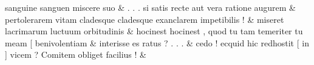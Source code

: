 \documentclass[12pt,onecolumn,twoside,a4paper]{memoir}
\begin{document}
\begin{pairs}
\begin{Leftside}
                              sanguine
                              sanguen
                              miscere
                              suo \&
                         \stanza {}
                     .
                              .
                              .
                              si
                              satis
                              recte
                              aut
                              vera
                              ratione
                              augurem \&
                         \stanza {}
                     pertolerarem
                              vitam
                              cladesque
                              {cladesque}
                              exanclarem
                              impetibilis
                              ! \&
                         \stanza {}
                     miseret
                              lacrimarum
                              luctuum
                              orbitudinis \&
                         \stanza {}hocinest
                              {hocinest}
                              ,
                              quod
                              tu
                              tam
                              temeriter
                              tu
                              meam
                              [
                              benivolentiam & 
                     interisse
                              es
                              ratus
                              ?
                              .
                              .
                              . \&
                         \stanza {}
                     cedo
                              !
                              ecquid
                              hic
                              redhostit
                              [
                              in
                              ]
                              vicem
                              ?
                              Comitem
                              obliget
                              facilius
                              ! \&
                     

\end{Leftside}
\end{pairs}
\end{document}
